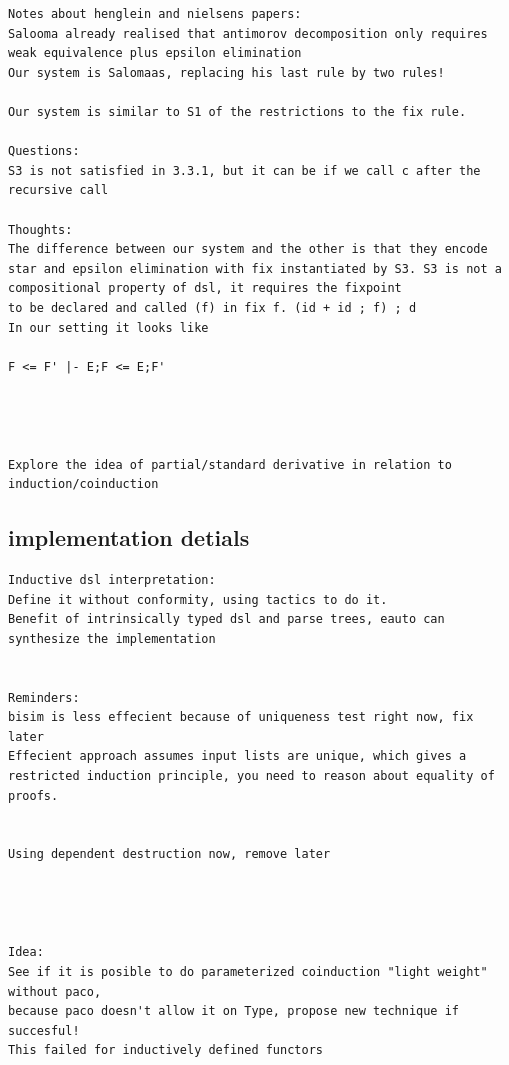 \begin{verbatim}
Notes about henglein and nielsens papers:
Salooma already realised that antimorov decomposition only requires weak equivalence plus epsilon elimination
Our system is Salomaas, replacing his last rule by two rules!

Our system is similar to S1 of the restrictions to the fix rule.

Questions:
S3 is not satisfied in 3.3.1, but it can be if we call c after the recursive call

Thoughts:
The difference between our system and the other is that they encode star and epsilon elimination with fix instantiated by S3. S3 is not a compositional property of dsl, it requires the fixpoint 
to be declared and called (f) in fix f. (id + id ; f) ; d
In our setting it looks like

F <= F' |- E;F <= E;F'




Explore the idea of partial/standard derivative in relation to induction/coinduction

\end{verbatim}

\subsection{implementation detials}
\begin{verbatim}
Inductive dsl interpretation:
Define it without conformity, using tactics to do it. 
Benefit of intrinsically typed dsl and parse trees, eauto can synthesize the implementation


Reminders:
bisim is less effecient because of uniqueness test right now, fix later
Effecient approach assumes input lists are unique, which gives a restricted induction principle, you need to reason about equality of proofs.


Using dependent destruction now, remove later 




Idea:
See if it is posible to do parameterized coinduction "light weight" without paco, 
because paco doesn't allow it on Type, propose new technique if succesful!
This failed for inductively defined functors

\end{verbatim}


